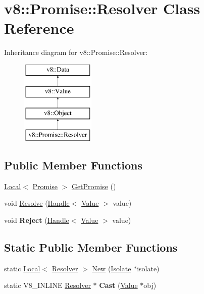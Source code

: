 \hypertarget{classv8_1_1Promise_1_1Resolver}{}\section{v8\+:\+:Promise\+:\+:Resolver Class Reference}
\label{classv8_1_1Promise_1_1Resolver}
Inheritance diagram for v8\+:\+:Promise\+:\+:Resolver\+:\begin{figure}[H]
\begin{center}
\leavevmode
\includegraphics[height=4.000000cm]{classv8_1_1Promise_1_1Resolver}
\end{center}
\end{figure}
\subsection*{Public Member Functions}
\begin{DoxyCompactItemize}
\item 
\hyperlink{classv8_1_1Local}{Local}$<$ \hyperlink{classv8_1_1Promise}{Promise} $>$ \hyperlink{classv8_1_1Promise_1_1Resolver_a41fd1ffef546a62e363a639935fc8ae3}{Get\+Promise} ()
\item 
void \hyperlink{classv8_1_1Promise_1_1Resolver_aa1f7f6883d57879a7956e84e63b2d935}{Resolve} (\hyperlink{classv8_1_1Handle}{Handle}$<$ \hyperlink{classv8_1_1Value}{Value} $>$ value)
\item 
\hypertarget{classv8_1_1Promise_1_1Resolver_a12b1f6ef41dd7d759443631135502847}{}void {\bfseries Reject} (\hyperlink{classv8_1_1Handle}{Handle}$<$ \hyperlink{classv8_1_1Value}{Value} $>$ value)\label{classv8_1_1Promise_1_1Resolver_a12b1f6ef41dd7d759443631135502847}

\end{DoxyCompactItemize}
\subsection*{Static Public Member Functions}
\begin{DoxyCompactItemize}
\item 
static \hyperlink{classv8_1_1Local}{Local}$<$ \hyperlink{classv8_1_1Promise_1_1Resolver}{Resolver} $>$ \hyperlink{classv8_1_1Promise_1_1Resolver_a80b9e402b6b49f41d57d404ed9e00c9d}{New} (\hyperlink{classv8_1_1Isolate}{Isolate} $\ast$isolate)
\item 
\hypertarget{classv8_1_1Promise_1_1Resolver_ab2b541cb210158ed0c757c8b7dc46279}{}static V8\+\_\+\+I\+N\+L\+I\+N\+E \hyperlink{classv8_1_1Promise_1_1Resolver}{Resolver} $\ast$ {\bfseries Cast} (\hyperlink{classv8_1_1Value}{Value} $\ast$obj)\label{classv8_1_1Promise_1_1Resolver_ab2b541cb210158ed0c757c8b7dc46279}

\end{DoxyCompactItemize}


